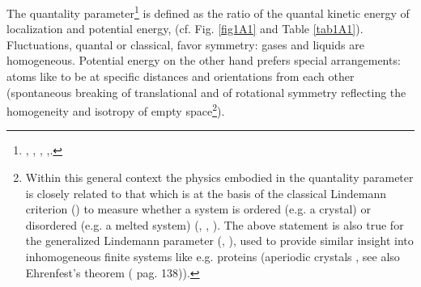 The quantality parameter\footnote{\cite{Nosanow:76}, \cite{deBoer:57}, \cite{deBoer:48}, \cite{deBoer:48b},\cite{Mottelson:02}.} is defined as the ratio of the quantal kinetic energy of localization and potential energy, (cf. Fig. \ref{fig1A1} and Table \ref{tab1A1}).
 Fluctuations, quantal or classical, favor symmetry: gases and liquids are homogeneous. Potential energy on the other hand prefers special arrangements: atoms like to be at specific distances and orientations from each other (spontaneous breaking of translational and of rotational symmetry reflecting the homogeneity and isotropy of empty space\footnote{Within this general context the physics embodied in the quantality parameter is closely related to that which is at the basis of the classical Lindemann criterion (\cite{Lindemann:10}) to measure whether a system is ordered (e.g. a crystal) or disordered (e.g. a melted system) (\cite{Bilgram:87}, \cite{Lowen:94}, \cite{Stillinger:95}). The above statement is also true for the generalized Lindemann parameter (\cite{Stillinger:90}, \cite{Zhou:99}), used to provide similar insight into inhomogeneous finite systems like e.g. proteins (aperiodic crystals \cite{Schrodinger:44}, see also Ehrenfest's theorem (\cite{Basdevant:05} pag. 138)).}).
 
